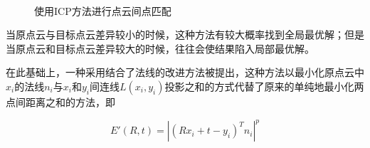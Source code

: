 \documentclass{llncs}
\begin{document}
\begin{CJK}{UTF8}{song}
\begin{figure}[htbp]
\centering
{} \\
\caption{使用ICP方法进行点云间点匹配}
\label{ICPfig}
\end{figure}

当原点云与目标点云差异较小的时候，这种方法有较大概率找到全局最优解；但是当原点云和目标点云差异较大的时候，往往会使结果陷入局部最优解。

在此基础上，一种采用结合了法线的改进方法被提出\cite{Chen1992Object}，这种方法以最小化原点云中$x_i$的法线$n_i$与$x_i$和$y_i$间连线$L(x_i,y_i)$投影之和的方式代替了原来的单纯地最小化两点间距离之和的方法，即

\begin{equation}
E'(R,t) = |(Rx_i+t-y_i)^Tn_i|^p
\end{equation}


\end{CJK}
\end{document}
